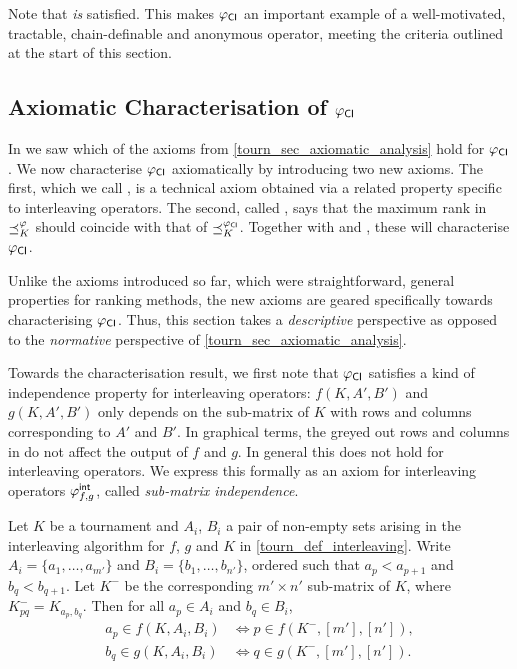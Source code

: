 Note that \anon{} \emph{is} satisfied. This makes ${\varphi_{\mathsf{CI}}}$ an
important example of a well-motivated, tractable, chain-definable
and anonymous operator, meeting the criteria outlined at the start of
this section.

\subsection{Axiomatic Characterisation of ${\varphi_{\mathsf{CI}}}$}

In  we saw which of the axioms from
\cref{tourn_sec_axiomatic_analysis} hold for ${\varphi_{\mathsf{CI}}}$. We now characterise
${\varphi_{\mathsf{CI}}}$ axiomatically by introducing two new axioms. The first, which we
call \rankremoval{}, is a technical axiom obtained via a related
property specific to interleaving operators. The second, called
\argmaxaxiom{}, says that the maximum rank in $\preceq_K^\varphi$ should coincide
with that of $\preceq_K^{{\varphi_{\mathsf{CI}}}}$. Together with \dualaxiom{} and
\chaindef{}, these will characterise ${\varphi_{\mathsf{CI}}}$.

Unlike the axioms introduced so far, which were straightforward, general
properties for ranking methods, the new axioms are geared specifically towards
characterising ${\varphi_{\mathsf{CI}}}$. Thus, this section takes a \emph{descriptive}
perspective as opposed to the \emph{normative} perspective of
\cref{tourn_sec_axiomatic_analysis}.

Towards the characterisation result, we first note that ${\varphi_{\mathsf{CI}}}$ satisfies
a kind of independence property for interleaving operators: $f(K, A', B')$ and
$g(K, A', B')$ only depends on the sub-matrix of $K$ with rows and columns
corresponding to $A'$ and $B'$. In graphical terms, the greyed out rows and
columns in  do not affect the output of $f$ and
$g$. In general this does not hold for interleaving operators. We express this
formally as an axiom for interleaving operators ${\varphi_{f, g}^\mathsf{int}}$, called
\emph{sub-matrix independence}.

\begin{axiom}[\smi{}]
    Let $K$ be a tournament and $A_i$, $B_i$ a pair of non-empty sets arising
    in the interleaving algorithm for $f$, $g$ and $K$ in
    \cref{tourn_def_interleaving}. Write $A_i = \{a_1, \ldots, a_{m'}\}$ and
    $B_i = \{b_1, \ldots, b_{n'}\}$, ordered such that $a_p < a_{p+1}$ and $b_q
    < b_{q+1}$. Let $K^-$ be the corresponding $m' \times n'$ sub-matrix of
    $K$, where $K^-_{pq} = K_{a_p,b_q}$. Then for all $a_p \in A_i$ and $b_q
    \in B_i$,
    \begin{align*}
        a_p \in f(K, A_i, B_i) &\iff p \in f(K^-, [m'], [n']), \\
        b_q \in g(K, A_i, B_i) &\iff q \in g(K^-, [m'], [n']).
    \end{align*}
\end{axiom}


